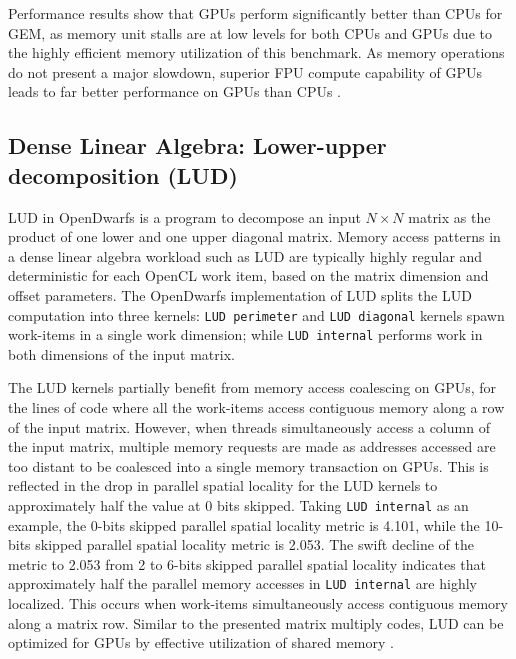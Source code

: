 \documentclass[review=false, sigchi]{acmart}
\begin{document}
	Performance results \cite{johnston18opendwarfs, krommydas2016opendwarfs} show that GPUs perform significantly better than CPUs for GEM, as memory unit stalls are at low levels for both CPUs and GPUs due to the highly efficient memory utilization of this benchmark. 
	As memory operations do not present a major slowdown, superior FPU compute capability of GPUs leads to far better performance on GPUs than CPUs \cite{krommydas2016opendwarfs}. 
	
	\subsection{Dense Linear Algebra: Lower-upper decomposition (LUD)}
	
	LUD in OpenDwarfs is a program to decompose an input $N\times N$ matrix as the product of one lower and one upper diagonal matrix. 
	Memory access patterns in a dense linear algebra workload such as LUD are typically highly regular and deterministic for each OpenCL work item, based on the matrix dimension and offset parameters. The OpenDwarfs implementation of LUD \cite{opendwarfs2020head} splits the LUD computation into three kernels: \texttt{LUD perimeter} and \texttt{LUD diagonal} kernels spawn work-items in a single work dimension; while \texttt{LUD internal} performs work in both dimensions of the input matrix.
	
	The LUD kernels partially benefit from memory access coalescing on GPUs, for the lines of code where all the work-items access contiguous memory along a row of the input matrix. 
	However, when threads simultaneously access a column of the input matrix, multiple memory requests are made as addresses accessed are too distant to be coalesced into a single memory transaction on GPUs. 
	This is reflected in the drop in parallel spatial locality for the LUD kernels to approximately half the value at 0 bits skipped. Taking \texttt{LUD internal} as an example, the 0-bits skipped parallel spatial locality metric is 4.101, while the 10-bits skipped parallel spatial locality metric is 2.053. 
	The swift decline of the metric to 2.053 from 2 to 6-bits skipped parallel spatial locality indicates that approximately half the parallel memory accesses in \texttt{LUD internal} are highly localized. This occurs when work-items simultaneously access contiguous memory along a matrix row. 
	Similar to the presented matrix multiply codes, LUD can be optimized for GPUs by effective utilization of shared memory \cite{opendwarfs2020head}.
	
	
\end{document}
